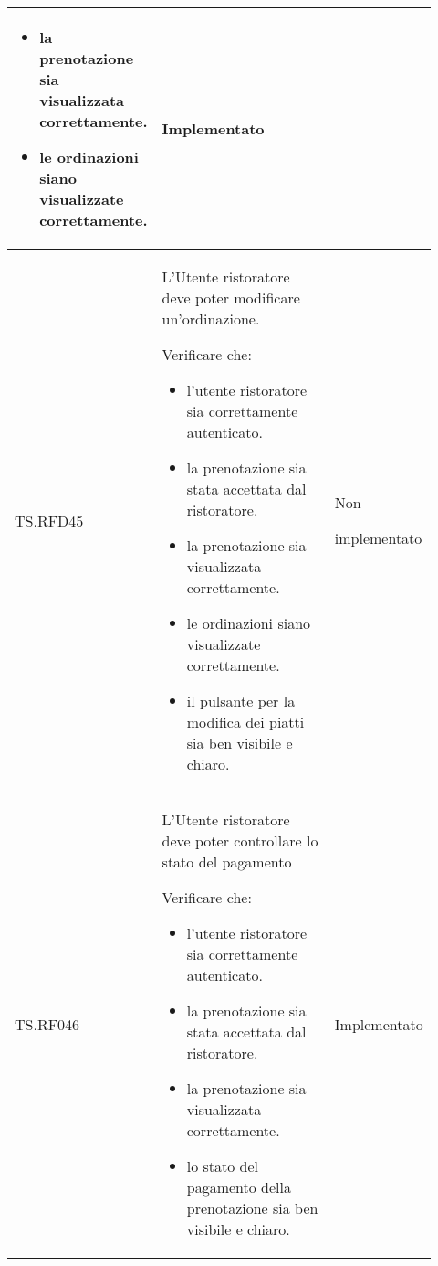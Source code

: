 \begin{longtable}{|p{0.10\linewidth}|p{0.70\linewidth}|p{0.12\linewidth}|}
\begin{itemize}
		\item la prenotazione sia visualizzata correttamente.
		\item le ordinazioni siano visualizzate correttamente.
	\end{itemize}                                                                      &
	Implementato                                                                                                                                                            \\
	\hline
	TS.RFD45                                                                                                                        &
	L'Utente ristoratore deve poter modificare un'ordinazione. \par
	Verificare che:
	\begin{itemize}
		\item l'utente ristoratore sia correttamente autenticato.
		\item la prenotazione sia stata accettata dal ristoratore.
		\item la prenotazione sia visualizzata correttamente.
		\item le ordinazioni siano visualizzate correttamente.
		\item il pulsante per la modifica dei piatti sia ben visibile e chiaro.
	\end{itemize}                                                         &
	Non \par implementato                                                                                                                                                   \\
	\hline
	TS.RF046                                                                                                                        &
	L'Utente ristoratore deve poter controllare lo stato del pagamento  \par
	Verificare che:
	\begin{itemize}
		\item l'utente ristoratore sia correttamente autenticato.
		\item la prenotazione sia stata accettata dal ristoratore.
		\item la prenotazione sia visualizzata correttamente.
		\item lo stato del pagamento della prenotazione sia ben visibile e chiaro.
	\end{itemize}                                                      &
	Implementato                                                                                                                                                            \\

\end{longtable}
